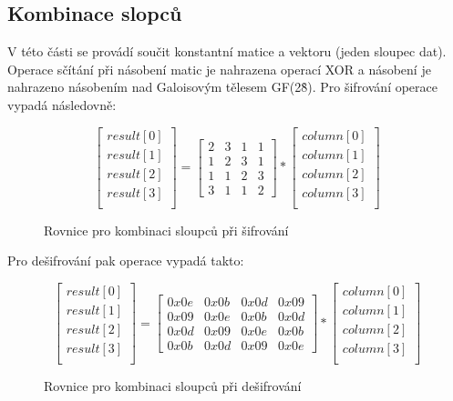 \documentclass[12pt, a4paper]{article}
\begin{document}
\subsection{Kombinace slopců}
V této části se provádí součit konstantní matice a vektoru (jeden sloupec dat). Operace sčítání při násobení matic
je nahrazena operací XOR a násobení je nahrazeno násobením nad Galoisovým tělesem GF(2\^8). Pro šifrování operace
vypadá následovně:

\begin{figure}
\begin{equation}
    \begin{bmatrix}
    result[0] \\
    result[1] \\
    result[2] \\
    result[3] \\
    \end{bmatrix}
    =
    \begin{bmatrix}
    2 & 3 & 1 & 1 \\
    1 & 2 & 3 & 1 \\
    1 & 1 & 2 & 3 \\
    3 & 1 & 1 & 2
    \end{bmatrix}
    *
     \begin{bmatrix}
    column[0] \\
    column[1] \\
    column[2] \\
    column[3] \\
    \end{bmatrix}
\end{equation}
\caption{Rovnice pro kombinaci sloupců při šifrování}
\end{figure}

Pro dešifrování pak operace vypadá takto:
    
\begin{figure}
\begin{equation}
    \begin{bmatrix}
    result[0] \\
    result[1] \\
    result[2] \\
    result[3] \\
    \end{bmatrix}
    =
    \begin{bmatrix}
    0x0e & 0x0b & 0x0d & 0x09 \\
    0x09 & 0x0e & 0x0b & 0x0d \\
    0x0d & 0x09 & 0x0e & 0x0b \\
    0x0b & 0x0d & 0x09 & 0x0e
    \end{bmatrix}
    *
     \begin{bmatrix}
    column[0] \\
    column[1] \\
    column[2] \\
    column[3] \\
    \end{bmatrix}
\end{equation}
\caption{Rovnice pro kombinaci sloupců při dešifrování}
\end{figure}
\end{document}
